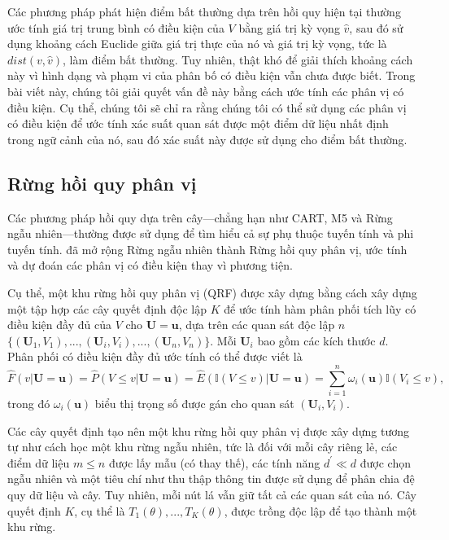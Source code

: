 Các phương pháp phát hiện điểm bất thường dựa trên hồi quy hiện tại thường ước tính giá trị trung bình có điều kiện của $V$ bằng giá trị kỳ vọng $\hat{v}$, sau đó sử dụng khoảng cách Euclide giữa giá trị thực của nó và giá trị kỳ vọng, tức là $dist(v,\hat{v})$, làm điểm bất thường. Tuy nhiên, thật khó để giải thích khoảng cách này vì hình dạng và phạm vi của phân bố có điều kiện vẫn chưa được biết. Trong bài viết này, chúng tôi giải quyết vấn đề này bằng cách ước tính các phân vị có điều kiện. Cụ thể, chúng tôi sẽ chỉ ra rằng chúng tôi có thể sử dụng các phân vị có điều kiện để ước tính xác suất quan sát được một điểm dữ liệu nhất định trong ngữ cảnh của nó, sau đó xác suất này được sử dụng cho điểm bất thường.

\subsection{Rừng hồi quy phân vị}
\label{subsec:QRF}Các phương pháp hồi quy dựa trên cây---chẳng hạn như CART, M5 và Rừng ngẫu nhiên---thường được sử dụng để tìm hiểu cả sự phụ thuộc tuyến tính và phi tuyến tính. \cite{meinshausen2006quantile} đã mở rộng Rừng ngẫu nhiên thành Rừng hồi quy phân vị, ước tính và dự đoán các phân vị có điều kiện thay vì phương tiện.

Cụ thể, một khu rừng hồi quy phân vị (QRF) được xây dựng bằng cách xây dựng một tập hợp các cây quyết định độc lập $K$ để ước tính hàm phân phối tích lũy có điều kiện đầy đủ của $V$ cho $\mathbf{U} = \mathbf{u}$, dựa trên các quan sát độc lập $n$ $\{(\mathbf{U}_{1},V_{1}),...,(\mathbf{U}_{i},V_{i}),...,(\mathbf{U}_{n},V_{n})\}$. Mỗi $\mathbf{U}_{i}$ bao gồm các kích thước $d$. Phân phối có điều kiện đầy đủ ước tính có thể được viết là
\begin{equation}
\hat{F}(v \vert \mathbf{U}=\mathbf{u}) = \hat{P}(V \leq v \vert \mathbf{U}=\mathbf{u}) = \hat{E}( \mathbb{I}(V \leq v) \vert \mathbf{U}=\mathbf{u}) = \sum_{i=1}^{n}\omega_{i}(\mathbf{u})\mathbb{I}(V_i \leq v),
\label{eq1}
\end{equation}
trong đó $\omega_{i}(\mathbf{u})$ biểu thị trọng số được gán cho quan sát $(\mathbf{U}_{i},V_{i})$.

Các cây quyết định tạo nên một khu rừng hồi quy phân vị được xây dựng tương tự như cách học một khu rừng ngẫu nhiên, tức là đối với mỗi cây riêng lẻ, các điểm dữ liệu $m \leq n$ được lấy mẫu (có thay thế), các tính năng $d^{'} \ll d$ được chọn ngẫu nhiên và một tiêu chí như thu thập thông tin được sử dụng để phân chia đệ quy dữ liệu và cây. Tuy nhiên, mỗi nút lá vẫn giữ tất cả các quan sát của nó. Cây quyết định $K$, cụ thể là $T_{1}(\theta),...,T_{K}(\theta)$, được trồng độc lập để tạo thành một khu rừng.


